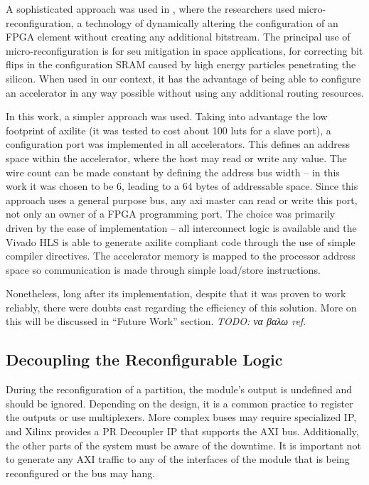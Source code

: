 A sophisticated approach was used in \cite{charitopoulos}, where the researchers used
micro-reconfiguration, a technology of dynamically altering the configuration of an
FPGA element without creating any additional bitstream.
The principal use of micro-reconfiguration is for \gls{seu} mitigation in space applications,
for correcting bit flips in the configuration SRAM caused by high energy particles
penetrating the silicon.
When used in our context, it has the advantage of being able to configure an
accelerator in any way possible without using any additional routing resources.

In this work, a simpler approach was used. Taking into advantage the low footprint of
\gls{axilite} (it was tested to cost about 100 \glspl{lut} for a slave port),
a configuration port was implemented in all accelerators. This defines
an address space within the accelerator, where the host may read or write any value.
The wire count can be made constant by defining the address bus width -- in this work
it was chosen to be 6, leading to a 64 bytes of addressable space. Since this approach
uses a general purpose bus, any \gls{axi} master can read or write this port,
not only an owner of a FPGA programming port. The choice was primarily driven by
the ease of implementation -- all interconnect logic is available and the Vivado HLS
is able to generate \gls{axilite} compliant code through the use of simple compiler
directives. The accelerator memory is mapped to the processor address space
so communication is made through simple load/store instructions.

Nonetheless, long after its implementation, despite that it was proven to work reliably,
there were doubts cast regarding the efficiency of this solution.
More on this will be discussed in ``Future Work'' section. \emph{TODO: να βαλω ref}.

\subsection{Decoupling the Reconfigurable Logic}

During the reconfiguration of a partition, the module's output is undefined and should be ignored.
Depending on the design, it is a common practice to register the outputs or use multiplexers.
More complex buses may require specialized IP, and Xilinx provides a PR Decoupler IP that
supports the AXI bus. Additionally, the other parts of the system must be aware of the downtime.
It is important not to generate any AXI traffic to any of the interfaces of the module that is
being reconfigured or the bus may hang.

